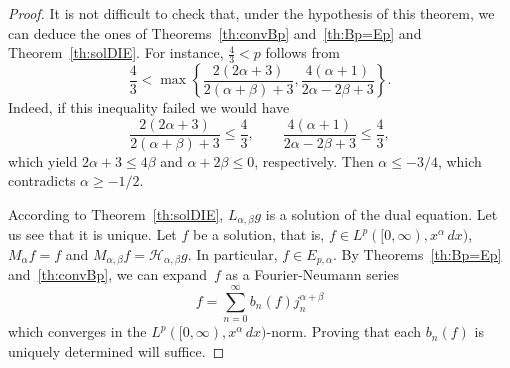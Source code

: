 \documentclass[12pt,leqno]{amsart}
\theoremstyle{plain}
\newcommand{\hab}{\mathcal{H}_{\alpha,\beta}}
\begin{document}
\begin{proof}
It is not difficult to check that, under the hypothesis of this theorem,
we can deduce the ones of Theorems~\ref{th:convBp} and~\ref{th:Bp=Ep} and
Theorem~\ref{th:solDIE}. For instance, $\tfrac43 < p$ follows from
\begin{equation*}
    \frac43 <
    \max\left\{ \frac{2(2\alpha+3)}{2(\alpha+\beta)+3},
                 \frac{4(\alpha+1)}{2\alpha-2\beta+3} \right\}.
\end{equation*}
Indeed, if this inequality failed we would have
\begin{equation*}
   \frac{2(2\alpha+3)}{2(\alpha+\beta)+3} \leq \frac43,
   \qquad
   \frac{4(\alpha+1)}{2\alpha-2\beta+3} \leq \frac43,
\end{equation*}
which yield $2\alpha + 3 \leq 4\beta$ and $\alpha + 2\beta \leq 0$,
respectively. Then $\alpha \leq -3/4$, which contradicts $\alpha \geq
-1/2$.

According to Theorem~\ref{th:solDIE}, $L_{\alpha,\beta}g$ is a solution of the
dual equation. Let us see that it is unique. Let $f$ be a solution, that
is, $f \in  L^p([0,\infty),x^{\alpha}\,dx)$, $M_\alpha f = f$ and
$M_{\alpha,\beta}f = \hab g$. In particular, $f \in E_{p,\alpha}$. By
Theorems~\ref{th:Bp=Ep} and~\ref{th:convBp}, we can expand~$f$ as a
Fourier-Neumann series
\begin{equation*}
    f = \sum_{n=0}^{\infty} b_n(f) j_n^{\alpha+\beta}
\end{equation*}
which converges in the $L^p([0,\infty),x^\alpha\,dx)$-norm. Proving that each
$b_n(f)$ is uniquely determined will suffice.


\end{proof}
\end{document}
